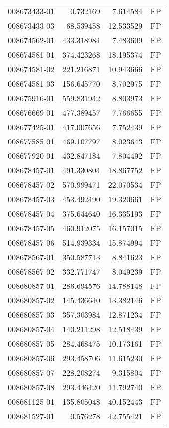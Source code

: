 \begin{tabular}{lrrl}
008673433-01 &    0.732169 &     7.614584 &   FP \\
008673433-03 &   68.539458 &    12.533529 &   FP \\
008674562-01 &  433.318984 &     7.483609 &   FP \\
008674581-01 &  374.423268 &    18.195374 &   FP \\
008674581-02 &  221.216871 &    10.943666 &   FP \\
008674581-03 &  156.645770 &     8.702975 &   FP \\
008675916-01 &  559.831942 &     8.803973 &   FP \\
008676669-01 &  477.389457 &     7.766655 &   FP \\
008677425-01 &  417.007656 &     7.752439 &   FP \\
008677585-01 &  469.107797 &     8.023643 &   FP \\
008677920-01 &  432.847184 &     7.804492 &   FP \\
008678457-01 &  491.330804 &    18.867752 &   FP \\
008678457-02 &  570.999471 &    22.070534 &   FP \\
008678457-03 &  453.492490 &    19.320661 &   FP \\
008678457-04 &  375.644640 &    16.335193 &   FP \\
008678457-05 &  460.912075 &    16.157015 &   FP \\
008678457-06 &  514.939334 &    15.874994 &   FP \\
008678567-01 &  350.587713 &     8.841623 &   FP \\
008678567-02 &  332.771747 &     8.049239 &   FP \\
008680857-01 &  286.694576 &    14.788148 &   FP \\
008680857-02 &  145.436640 &    13.382146 &   FP \\
008680857-03 &  357.303984 &    12.871234 &   FP \\
008680857-04 &  140.211298 &    12.518439 &   FP \\
008680857-05 &  284.468475 &    10.173161 &   FP \\
008680857-06 &  293.458706 &    11.615230 &   FP \\
008680857-07 &  228.208274 &     9.315804 &   FP \\
008680857-08 &  293.446420 &    11.792740 &   FP \\
008681125-01 &  135.805048 &    40.152443 &   FP \\
008681527-01 &    0.576278 &    42.755421 &   FP \\

\end{tabular}
